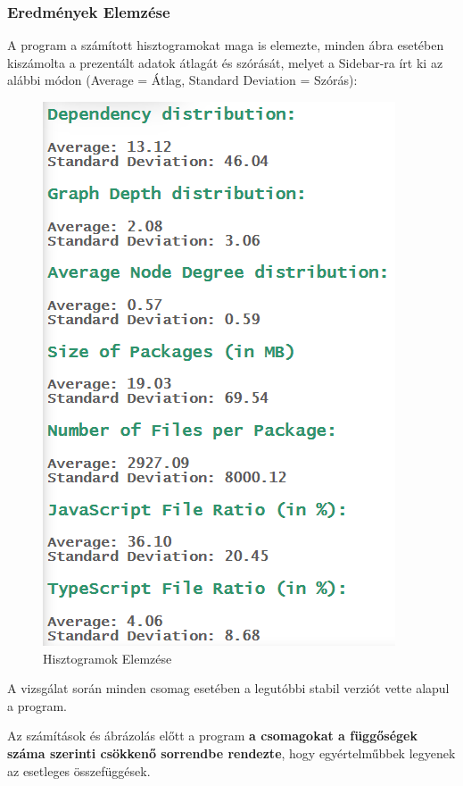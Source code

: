 \pagebreak

\subsubsection{Eredmények Elemzése}

A program a számított hisztogramokat maga is elemezte, minden ábra esetében kiszámolta a prezentált adatok átlagát és szórását, melyet a Sidebar-ra írt ki az alábbi módon (Average = Átlag, Standard Deviation = Szórás):

\begin{figure}[!h]
	\centering
	\includegraphics[scale=0.35]{images/hg_data.png}
	\caption{Hisztogramok Elemzése}
	\label{fig:hg_data}
\end{figure}

A vizsgálat során minden csomag esetében a legutóbbi stabil verziót vette alapul a program. 

Az számítások és ábrázolás előtt a program \textbf{a csomagokat a függőségek száma szerinti csökkenő sorrendbe rendezte}, hogy egyértelműbbek legyenek az esetleges összefüggések.

